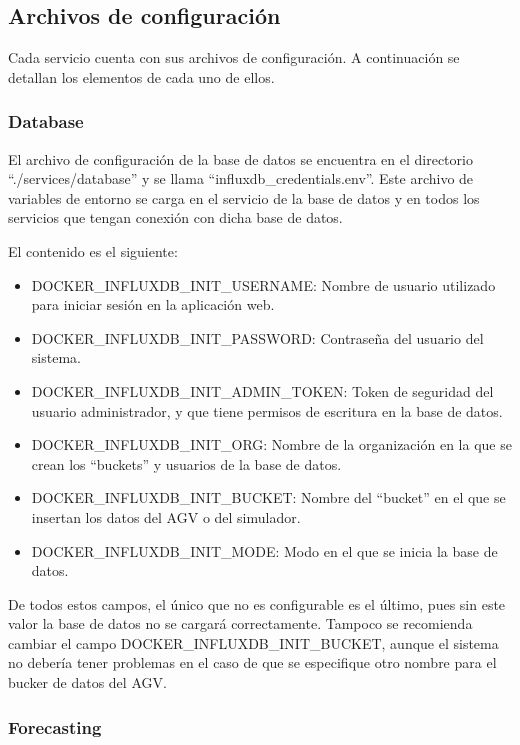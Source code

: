 \subsection{Archivos de configuración}

Cada servicio cuenta con sus archivos de configuración. A continuación se detallan los elementos 
de cada uno de ellos.

\subsubsection{Database}
El archivo de configuración de la base de datos se encuentra en el directorio ``./services/database'' 
y se llama ``influxdb\_credentials.env''. Este archivo de variables de entorno se carga en el servicio 
de la base de datos y en todos los servicios que tengan conexión con dicha base de datos.

El contenido es el siguiente:
\begin{itemize}
    \item DOCKER\_INFLUXDB\_INIT\_USERNAME: Nombre de usuario utilizado para iniciar sesión en la aplicación web.
    \item DOCKER\_INFLUXDB\_INIT\_PASSWORD: Contraseña del usuario del sistema.
    \item DOCKER\_INFLUXDB\_INIT\_ADMIN\_TOKEN: Token de seguridad del usuario administrador, y que tiene permisos 
        de escritura en la base de datos.
    \item DOCKER\_INFLUXDB\_INIT\_ORG: Nombre de la organización en la que se crean los ``buckets'' y usuarios de
        la base de datos.
    \item DOCKER\_INFLUXDB\_INIT\_BUCKET: Nombre del ``bucket'' en el que se insertan los datos del AGV o del simulador.
    \item DOCKER\_INFLUXDB\_INIT\_MODE: Modo en el que se inicia la base de datos.
\end{itemize}
De todos estos campos, el único que no es configurable es el último, pues sin este valor la base de datos 
no se cargará correctamente. Tampoco se recomienda cambiar el campo DOCKER\_INFLUXDB\_INIT\_BUCKET, aunque 
el sistema no debería tener problemas en el caso de que se especifique otro nombre para el bucker de datos del AGV.

\subsubsection{Forecasting}

